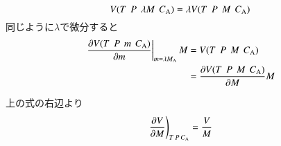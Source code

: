 \documentclass[a4paper,12pt, oneside, openany]{jsbook}
\begin{document}
\begin{equation}
  V(T\hspace{1.5mm}  P\hspace{1.5mm} \lambda M \hspace{1.5mm}C_\mathrm{A})=\lambda V(T\hspace{1.5mm}  P\hspace{1.5mm} M \hspace{1.5mm} C_\mathrm{A})
\end{equation}
\noindent 同じように$\lambda$で微分すると
\begin{equation}
\begin{split}
    \left.\frac{\partial V(T\hspace{1.5mm}  P\hspace{1.5mm} m \hspace{1.5mm}C_\mathrm{A})}{\partial m}\right|_{m=\lambda M_\mathrm{A}}M&=V(T\hspace{1.5mm}  P\hspace{1.5mm} M \hspace{1.5mm} C_\mathrm{A})\\
    &= \frac{\partial V(T\hspace{1.5mm}  P\hspace{1.5mm} M \hspace{1.5mm}C_\mathrm{A})}{\partial M}M
\end{split}
\end{equation}

\noindent 上の式の右辺より
\begin{equation}\label{M}
  \left.\frac{\partial V}{\partial M}\right)_{T\hspace{0.5mm}P\hspace{0.5mm}C_\mathrm{A}}=\frac{V}{M}
\end{equation}
\end{document}
